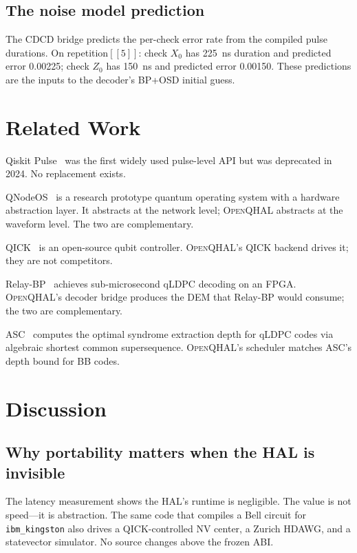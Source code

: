 \documentclass[aps,prApplied,twocolumn,superscriptaddress,floatfix]{revtex4-2}
\begin{document}
\subsection{The noise model prediction}

The CDCD bridge predicts the per-check error rate from the compiled
pulse durations. On repetition$[[5]]$: check $X_0$ has
\SI{225}{\nano\second} duration and predicted error \num{0.00225};
check $Z_0$ has \SI{150}{\nano\second} and predicted error
\num{0.00150}. These predictions are the inputs to the decoder's BP+OSD
initial guess.

\section{Related Work}
\label{sec:related}

Qiskit Pulse~\cite{aleksandrowicz2019qiskit} was the first widely used
pulse-level API but was deprecated in 2024. No replacement exists.

QNodeOS~\cite{qnodeos2025} is a research prototype quantum operating
system with a hardware abstraction layer. It abstracts at the network
level; \textsc{OpenQHAL} abstracts at the waveform level. The two are
complementary.

QICK~\cite{qick2023} is an open-source qubit controller.
\textsc{OpenQHAL}'s QICK backend drives it; they are not competitors.

Relay-BP~\cite{relaybp2024} achieves sub-microsecond qLDPC decoding on
an FPGA. \textsc{OpenQHAL}'s decoder bridge produces the DEM that
Relay-BP would consume; the two are complementary.

ASC~\cite{zhang2026optimal} computes the optimal syndrome extraction
depth for qLDPC codes via algebraic shortest common supersequence.
\textsc{OpenQHAL}'s scheduler matches ASC's depth bound for BB codes.

\section{Discussion}
\label{sec:discussion}

\subsection{Why portability matters when the HAL is invisible}

The latency measurement shows the HAL's runtime is negligible. The
value is not speed---it is abstraction. The same code that compiles a
Bell circuit for \texttt{ibm\_kingston} also drives a QICK-controlled
NV center, a Zurich HDAWG, and a statevector simulator. No source
changes above the frozen ABI.
\end{document}
